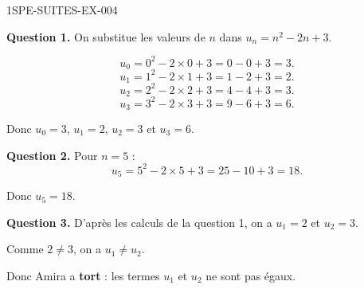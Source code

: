 \begin{corrige}{1SPE-SUITES-EX-004}


\textbf{Question 1.} On substitue les valeurs de $n$ dans $u_n = n^2 - 2n + 3$.

\[
u_0 = 0^2 - 2 \times 0 + 3 = 0 - 0 + 3 = 3.
\]
\[
u_1 = 1^2 - 2 \times 1 + 3 = 1 - 2 + 3 = 2.
\]
\[
u_2 = 2^2 - 2 \times 2 + 3 = 4 - 4 + 3 = 3.
\]
\[
u_3 = 3^2 - 2 \times 3 + 3 = 9 - 6 + 3 = 6.
\]

Donc $u_0 = 3$, $u_1 = 2$, $u_2 = 3$ et $u_3 = 6$.

\textbf{Question 2.} Pour $n = 5$ :
\[
u_5 = 5^2 - 2 \times 5 + 3 = 25 - 10 + 3 = 18.
\]

Donc $u_5 = 18$.


\textbf{Question 3.} D'après les calculs de la question 1, on a $u_1 = 2$ et $u_2 = 3$.

Comme $2
\neq 3$, on a $u_1
\neq u_2$.

Donc Amira a \textbf{tort} : les termes $u_1$ et $u_2$ ne sont pas égaux.

\end{corrige}
